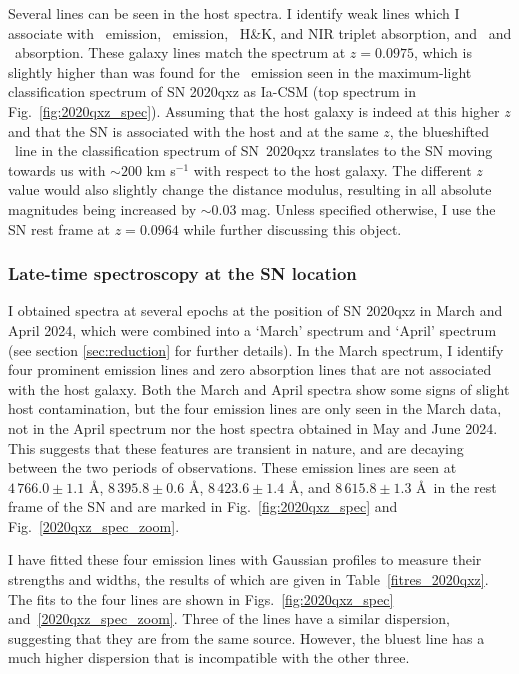 \documentclass[a4paper,oneside,12pt, class=Latex/Classes/PhDthesisPSnPDF, crop=false]{standalone}
\begin{document}
Several lines can be seen in the host spectra. I identify weak lines which I associate with \Halpha\ emission, \SIIF\ emission, \CaII\ H\&K, and NIR triplet absorption, and \NaID\ and \MgI\ absorption. These galaxy lines match the spectrum at $z=0.0975$, which is slightly higher than was found for the \Halpha\ emission seen in the maximum-light classification spectrum of SN 2020qxz as Ia-CSM (top spectrum in Fig.~\ref{fig:2020qxz_spec}). Assuming that the host galaxy is indeed at this higher $z$ and that the SN is associated with the host and at the same $z$, the blueshifted \Halpha\ line in the classification spectrum of SN~2020qxz translates to the SN moving towards us with $\sim200$ km s$^{-1}$ with respect to the host galaxy. The different $z$ value would also slightly change the distance modulus, resulting in all absolute magnitudes being increased by $\sim0.03$ mag. Unless specified otherwise, I use the SN rest frame at $z=0.0964$ while further discussing this object.


\subsubsection{Late-time spectroscopy at the SN location}
\label{2020qxz_spec}
I obtained spectra at several epochs at the position of SN 2020qxz in March and April 2024, which were combined into a `March' spectrum and `April' spectrum (see section \ref{sec:reduction} for further details). In the March spectrum, I identify four prominent emission lines and zero absorption lines that are not associated with the host galaxy. Both the March and April spectra show some signs of slight host contamination, but the four emission lines are only seen in the March data, not in the April spectrum nor the host spectra obtained in May and June 2024. This suggests that these features are transient in nature, and are decaying between the two periods of observations. These emission lines are seen at $4\,766.0\pm1.1$ \AA, $8\,395.8\pm0.6$ \AA,  $8\,423.6\pm1.4$ \AA, and $8\,615.8\pm1.3$ \AA\ in the rest frame of the SN and are marked in Fig.~\ref{fig:2020qxz_spec} and Fig.~\ref{2020qxz_spec_zoom}.

I have fitted these four emission lines with Gaussian profiles to measure their strengths and widths, the results of which are given in Table~\ref{fitres_2020qxz}. The fits to the four lines are shown in Figs.~\ref{fig:2020qxz_spec} and~\ref{2020qxz_spec_zoom}. Three of the lines have a similar dispersion, suggesting that they are from the same source. However, the bluest line has a much higher dispersion that is incompatible with the other three.
\end{document}

